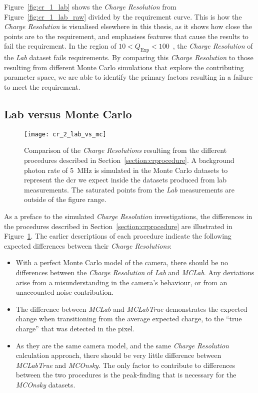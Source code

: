 Figure~\ref{fig:cr_1_lab} shows the \textit{Charge Resolution} from Figure~\ref{fig:cr_1_lab_raw} divided by the requirement curve. This is how the \textit{Charge Resolution} is visualised elsewhere in this thesis, as it shows how close the points are to the requirement, and emphasises features that cause the results to fail the requirement. In the region of $10 < Q_\text{Exp} < 100$~\si{\pe}, the \textit{Charge Resolution} of the \textit{Lab} dataset fails requirements. By comparing this \textit{Charge Resolution} to those resulting from different Monte Carlo simulations that explore the contributing parameter space, we are able to identify the primary factors resulting in a failure to meet the requirement.
\vfill

\subsection{Lab versus Monte Carlo}

\begin{figure}[H]
	\centering
    \texttt{[image: cr\_2\_lab\_vs\_mc]} 
	\caption[Comparison of the different \textit{Charge Resolution} procedures.]{Comparison of the \textit{Charge Resolutions} resulting from the different procedures described in Section~\ref{section:crprocedure}. A background photon rate of \SI{5}{MHz} is simulated in the Monte Carlo datasets to represent the \gls{dcr} we expect inside the datasets produced from lab measurements. The saturated points from the \textit{Lab} measurements are outside of the figure range.}
	\label{fig:cr_2_lab_vs_mc}
\end{figure}

As a preface to the simulated \textit{Charge Resolution} investigations, the differences in the procedures described in Section~\ref{section:crprocedure} are illustrated in Figure~\ref{fig:cr_2_lab_vs_mc}. The earlier descriptions of each procedure indicate the following expected differences between their \textit{Charge Resolutions}:
\begin{itemize}
\item With a perfect Monte Carlo model of the camera, there should be no differences between the \textit{Charge Resolution} of \textit{Lab} and \textit{MCLab}. Any deviations arise from a misunderstanding in the camera's behaviour, or from an unaccounted noise contribution.
\item The difference between \textit{MCLab} and \textit{MCLabTrue} demonstrates the expected change when transitioning from the average expected charge, to the ``true charge'' that was detected in the pixel.
\item As they are the same camera model, and the same \textit{Charge Resolution} calculation approach, there should be very little difference between \textit{MCLabTrue} and \textit{MCOnsky}. The only factor to contribute to differences between the two procedures is the peak-finding that is necessary for the \textit{MCOnsky} datasets.
\end{itemize}

